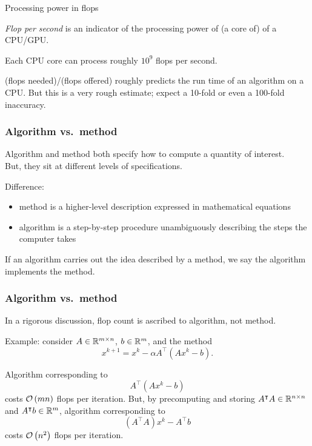 \documentclass[10pt,mathserif]{beamer}
\begin{document}
\begin{frame}{Processing power in flops}

\emph{Flop per second} is an indicator of the processing power of (a core of) of a CPU/GPU.
\vspace{0.2in}

Each CPU core can process roughly $10^9$ flops per second.
\vspace{0.2in}\pause

(flops needed)/(flops offered) roughly predicts the run time of an algorithm on a CPU.
But this is a very rough estimate; expect a 10-fold or even a 100-fold inaccuracy.
\end{frame}


\begin{frame}
\frametitle{Algorithm vs.\ method}
Algorithm and method both specify how to compute a quantity of interest.\\
\medskip
But, they sit at different levels of specifications.
\medskip\pause

Difference:
\begin{itemize}
\item
method is a higher-level description expressed in mathematical equations 
\item
algorithm is a step-by-step procedure unambiguously describing the steps the computer takes
\end{itemize}
\pause
If an algorithm carries out the idea described by a method, we say the algorithm implements the method.
\end{frame}


\begin{frame}[plain]
\frametitle{Algorithm vs.\ method}
In a rigorous discussion, flop count is ascribed to algorithm, not method.
\vspace{0.2in}\pause

Example: consider $A\in \mathbb{R}^{m\times n}$, $b\in \mathbb{R}^m$, and the method
\[
x^{k+1}=x^k-\alpha A^\intercal(Ax^k-b).
\]

Algorithm corresponding to 
\[
A^\intercal(Ax^k-b)
\]
costs ${\mathcal{O}\left(mn\right)}$ flops per iteration. But, by precomputing and storing $A^\intercal A\in\mathbb{R}^{n\times n}$ and $A^\intercal b\in \mathbb{R}^m$, algorithm corresponding to 
\[
(A^\intercal A)x^k-A^\intercal b
\]
costs ${\mathcal{O}\left(n^2\right)}$ flops per iteration.

\end{frame}
\end{document}
